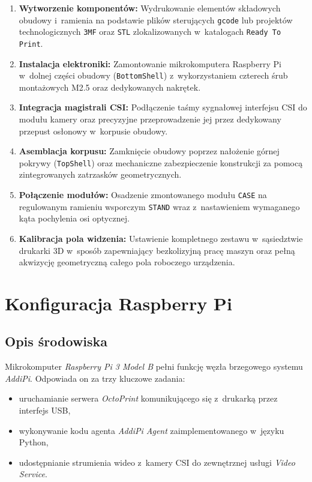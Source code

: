 \documentclass[a4paper,12pt,reqno]{article}
\begin{document}
\begin{enumerate}
	\item \textbf{Wytworzenie komponentów:} Wydrukowanie elementów składowych obudowy i~ramienia na podstawie plików sterujących \texttt{gcode} lub projektów technologicznych \texttt{3MF} oraz \texttt{STL} zlokalizowanych w~katalogach \texttt{Ready To Print}.
	\item \textbf{Instalacja elektroniki:} Zamontowanie mikrokomputera Raspberry Pi w~dolnej części obudowy (\texttt{BottomShell}) z~wykorzystaniem czterech śrub montażowych M2.5 oraz dedykowanych nakrętek.
	\item \textbf{Integracja magistrali CSI:} Podłączenie taśmy sygnałowej interfejsu CSI do modułu kamery oraz precyzyjne przeprowadzenie jej przez dedykowany przepust osłonowy w~korpusie obudowy.
	\item \textbf{Asemblacja korpusu:} Zamknięcie obudowy poprzez nałożenie górnej pokrywy (\texttt{TopShell}) oraz mechaniczne zabezpieczenie konstrukcji za pomocą zintegrowanych zatrzasków geometrycznych.
	\item \textbf{Połączenie modułów:} Osadzenie zmontowanego modułu \texttt{CASE} na regulowanym ramieniu wsporczym \texttt{STAND} wraz z~nastawieniem wymaganego kąta pochylenia osi optycznej.
	\item \textbf{Kalibracja pola widzenia:} Ustawienie kompletnego zestawu w~sąsiedztwie drukarki 3D w~sposób zapewniający bezkolizyjną pracę maszyn oraz pełną akwizycję geometryczną całego pola roboczego urządzenia.
\end{enumerate}


\newpage

\section{Konfiguracja Raspberry Pi}
\label{sec:rpi}

\subsection{Opis środowiska}

Mikrokomputer \textit{Raspberry Pi 3 Model B} pełni funkcję węzła brzegowego systemu \textit{AddiPi}. Odpowiada on za trzy kluczowe zadania:
\begin{itemize}
	\item uruchamianie serwera \textit{OctoPrint} komunikującego się z~drukarką przez interfejs USB,
	\item wykonywanie kodu agenta \textit{AddiPi Agent} zaimplementowanego w~języku Python,
	\item udostępnianie strumienia wideo z~kamery CSI do zewnętrznej usługi \textit{Video Service}.
\end{itemize}
\end{document}
